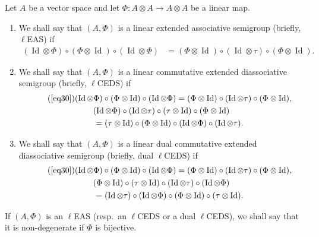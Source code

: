 \documentclass[pdftex]{sigma}
\numberwithin{equation}{section}
\begin{document}
\begin{Definition}\label{defi4.1}
Let $A$ be a vector space and let $\Phi\colon A\otimes A\longrightarrow A\otimes A$ be a linear map.
\begin{enumerate}\itemsep=0pt
\item[(1)] We shall say that $(A,\Phi)$ is a linear extended associative semigroup (briefly, $\ell$EAS) if
\begin{align}
\label{eq30}
(\operatorname{Id} \otimes \Phi)\circ (\Phi\otimes \operatorname{Id})\circ (\operatorname{Id} \otimes \Phi)&=(\Phi \otimes \operatorname{Id})\circ (\operatorname{Id} \otimes \tau)\circ (\Phi\otimes \operatorname{Id}).
\end{align}
\item[(2)] We shall say that $(A,\Phi)$ is a linear commutative extended diassociative semigroup (briefly, $\ell$CEDS) if
\begin{gather}
\tag{\ref{eq30}}(\operatorname{Id} \otimes \Phi)\circ (\Phi\otimes \operatorname{Id})\circ (\operatorname{Id} \otimes \Phi) =(\Phi \otimes \operatorname{Id})\circ (\operatorname{Id} \otimes \tau)\circ (\Phi\otimes \operatorname{Id}),\\
(\operatorname{Id} \otimes \Phi)\circ (\operatorname{Id} \otimes \tau) \circ (\tau \otimes \operatorname{Id})\circ (\Phi \otimes \operatorname{Id})\nonumber\\
\qquad =(\tau \otimes \operatorname{Id})\circ (\Phi \otimes \operatorname{Id})\circ (\operatorname{Id} \otimes \Phi)\circ (\operatorname{Id} \otimes \tau).\label{eq31}
\end{gather}
\item[(3)] We shall say that $(A,\Phi)$ is a linear dual commutative extended diassociative semigroup (briefly, dual $\ell$CEDS) if
\begin{gather}
\tag{\ref{eq30}}(\operatorname{Id} \otimes \Phi)\circ (\Phi\otimes \operatorname{Id})\circ (\operatorname{Id} \otimes \Phi)=(\Phi \otimes \operatorname{Id})\circ (\operatorname{Id} \otimes \tau)\circ (\Phi\otimes \operatorname{Id}),\\
(\Phi \otimes \operatorname{Id})\circ (\tau \otimes \operatorname{Id})\circ (\operatorname{Id} \otimes \tau)\circ (\operatorname{Id} \otimes \Phi)\nonumber\\
\qquad=(\operatorname{Id} \otimes \tau)\circ (\operatorname{Id} \otimes \Phi)\circ (\Phi \otimes \operatorname{Id})\circ (\tau \otimes \operatorname{Id}).\label{eq32}
\end{gather}\end{enumerate}
If $(A,\Phi)$ is an $\ell$EAS (resp.\ an $\ell$CEDS or a dual $\ell$CEDS), we shall say that it is non-degenerate if $\Phi$ is bijective.
\end{Definition}
\end{document}
